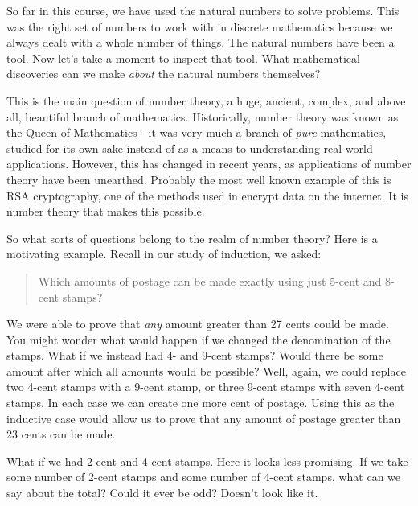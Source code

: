 \documentclass[12pt]{article}
\begin{document}

So far in this course, we have used the natural numbers to solve problems.  This was the right set of numbers to work with in discrete mathematics because we always dealt with a whole number of things.  The natural numbers have been a tool.  Now let's take a moment to inspect that tool.  What mathematical discoveries can we make {\em about} the natural numbers themselves?

This is the main question of number theory, a huge, ancient, complex, and above all, beautiful branch of mathematics.  Historically, number theory was known as the Queen of Mathematics - it was very much a branch of {\em pure} mathematics, studied for its own sake instead of as a means to understanding real world applications.  However, this has changed in recent years, as applications of number theory have been unearthed.  Probably the most well known example of this is RSA cryptography, one of the methods used in encrypt data on the internet.  It is number theory that makes this possible.

So what sorts of questions belong to the realm of number theory?  Here is a motivating example.  Recall in our study of induction, we asked:

\begin{quote}
	Which amounts of postage can be made exactly using just 5-cent and 8-cent stamps?
\end{quote}

We were able to prove that {\em any} amount greater than 27 cents could be made.  You might wonder what would happen if we changed the denomination of the stamps.  What if we instead had 4- and 9-cent stamps?  Would there be some amount after which all amounts would be possible?  Well, again, we could replace two 4-cent stamps with a 9-cent stamp, or three 9-cent stamps with seven 4-cent stamps.  In each case we can create one more cent of postage.  Using this as the inductive case would allow us to prove that any amount of postage greater than 23 cents can be made.  

What if we had 2-cent and 4-cent stamps.  Here it looks less promising.  If we take some number of 2-cent stamps and some number of 4-cent stamps, what can we say about the total?  Could it ever be odd?  Doesn't look like it.  
\end{document}
